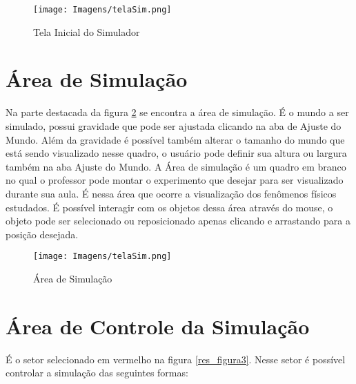 \begin{figure}[!htb]
	\caption{Tela Inicial do Simulador}
	\centering
	\texttt{[image: Imagens/telaSim.png]}
	
	\label{res_figura1}
\end{figure}


\section{Área de Simulação}
Na parte destacada da figura \ref{res_figura2} se encontra a área de simulação. É o mundo a ser simulado, possui gravidade que pode ser ajustada clicando na aba de Ajuste do Mundo. Além da gravidade é possível também alterar o tamanho do mundo que está sendo visualizado nesse quadro, o usuário pode definir sua altura ou largura também na aba Ajuste do Mundo. 
A Área de simulação é um quadro em branco no qual o professor pode montar o experimento que desejar para ser visualizado durante sua aula. É nessa área que ocorre a visualização dos fenômenos físicos estudados. É possível interagir com  os objetos dessa área através do mouse, o objeto pode ser selecionado ou reposicionado apenas clicando e arrastando para a posição desejada. 

\begin{figure}[!htb]
	\caption{Área de Simulação}
	\centering
	\texttt{[image: Imagens/telaSim.png]}
	
	\label{res_figura2}
\end{figure}


\section{Área de Controle da Simulação}
É o setor selecionado em vermelho na figura \ref{res_figura3}. Nesse setor é possível controlar a simulação das seguintes formas:

